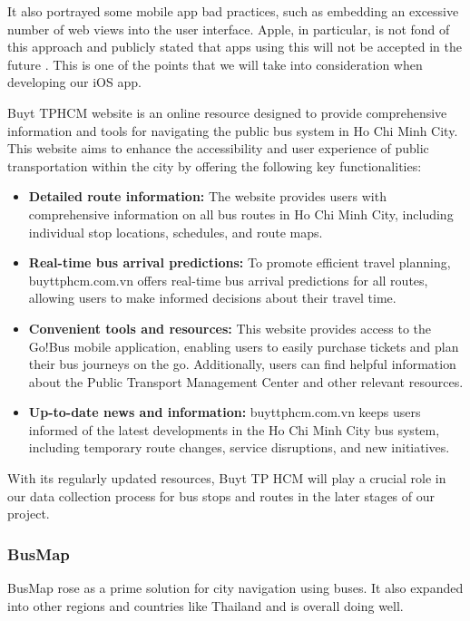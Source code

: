 It also portrayed some mobile app bad practices, such as embedding an excessive number of web views into the user interface. Apple, in particular, is not fond of this approach and publicly stated that apps using this will not be accepted in the future \cite{apple_webview}. This is one of the points that we will take into consideration when developing our iOS app.

Buyt TPHCM website is an online resource designed to provide comprehensive information and tools for navigating the public bus system in Ho Chi Minh City. This website aims to enhance the accessibility and user experience of public transportation within the city by offering the following key functionalities:

\begin{itemize}
    \item \textbf{Detailed route information:} The website provides users with comprehensive information on all bus routes in Ho Chi Minh City, including individual stop locations, schedules, and route maps.
    \item \textbf{Real-time bus arrival predictions:} To promote efficient travel planning, buyttphcm.com.vn offers real-time bus arrival predictions for all routes, allowing users to make informed decisions about their travel time.
    \item \textbf{Convenient tools and resources:} This website provides access to the Go!Bus mobile application, enabling users to easily purchase tickets and plan their bus journeys on the go. Additionally, users can find helpful information about the Public Transport Management Center and other relevant resources.
    \item \textbf{Up-to-date news and information:} buyttphcm.com.vn keeps users informed of the latest developments in the Ho Chi Minh City bus system, including temporary route changes, service disruptions, and new initiatives.
\end{itemize}

With its regularly updated resources, Buyt TP HCM will play a crucial role in our data collection process for bus stops and routes in the later stages of our project.

\subsubsection{BusMap}

BusMap rose as a prime solution for city navigation using buses. It also expanded into other regions and countries like Thailand and is overall doing well.


